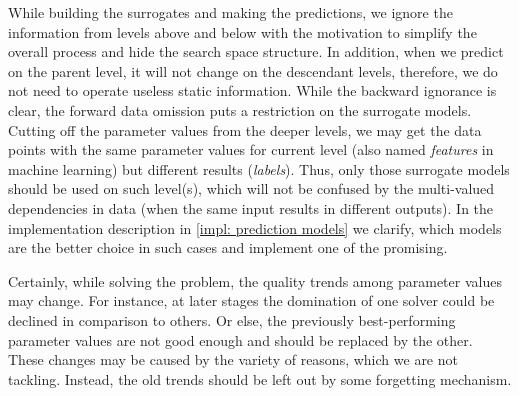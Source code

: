 While building the surrogates and making the predictions, we ignore the information from levels above and below with the motivation to simplify the overall process and hide the search space structure. In addition, when we predict on the parent level, it will not change on the descendant levels, therefore, we do not need to operate useless static information. While the backward ignorance is clear, the forward data omission puts a restriction on the surrogate models. Cutting off the parameter values from the deeper levels, we may get the data points with the same parameter values for current level (also named \emph{features} in machine learning) but different results (\emph{labels}). Thus, only those surrogate models should be used on such level(s), which will not be confused by the multi-valued dependencies in data (when the same input results in different outputs). In the implementation description in \cref{impl: prediction models} we clarify, which models are the better choice in such cases and implement one of the promising.

Certainly, while solving the problem, the quality trends among parameter values may change. For instance, at later stages the domination of one solver could be declined in comparison to others. Or else, the previously best-performing parameter values are not good enough and should be replaced by the other. These changes may be caused by the variety of reasons, which we are not tackling. Instead, the old trends should be left out by some forgetting mechanism.

